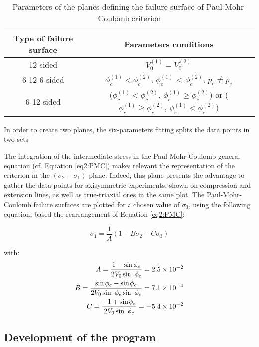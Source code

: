 \begin{table}
    \centering 
    \begin{tabular}{cc}
        \hline 
        Type of failure surface & Parameters conditions   \\
        \hline
        \hline
        12-sided & $V_0^{(1)} = V_0^{(2)}$ \\
        6-12-6 sided & $\phi_{c}^{(1)} < \phi_{c}^{(2)}$, $\phi_{e}^{(1)}$ < $\phi_{e}^{(2)}$, $p_c \neq p_e$\\ 
        6-12 sided & ($\phi_{c}^{(1)} < \phi_{c}^{(2)}$, $\phi_{e}^{(1)} \geq \phi_{e}^{(2)}$) or ($\phi_{c}^{(1)} \geq \phi_{c}^{(2)}$, $\phi_{e}^{(1)} < \phi_{e}^{(2)}$)\\
        \hline
    \end{tabular}
    \captionsetup{justification=centering}
    \caption{Parameters of the planes defining the failure surface of Paul-Mohr-Coulomb criterion}
    \label{tb5:pmc6p_pyramids}
\end{table}

In order to create two planes, the six-parameters fitting splits the data points in two sets 




The integration of the intermediate stress in the Paul-Mohr-Coulomb general equation (cf. Equation \ref{eq2:PMC}) makes relevant the representation of the criterion in the $(\sigma_2-\sigma_1)$ plane. Indeed, this plane presents the advantage to gather the data points for axisymmetric experiments, shown on compression and extension lines, as well as true-triaxial ones in the same plot. The Paul-Mohr-Coulomb failure surfaces are plotted for a chosen value of $\sigma_3$, using the following equation, based the rearrangement of Equation \ref{eq2:PMC}:

\begin{equation}\label{eq5:pmc_sig2sig1}
    \sigma_1 = \frac{1}{A}\left(1-B\sigma_2-C\sigma_3\right)
\end{equation}

with:
\begin{align}
    A = \frac{1-\sin \phi_c}{2V_0\sin \phi_c} = \num{2.5d-2}\\
    B = \frac{\sin \phi_c - \sin \phi_e}{2V_0 \sin \phi_e \sin \phi_c} = \num{7.1d-4} \\
    C = \frac{-1+\sin \phi_e}{2V_0\sin \phi_e} = -\num{5.4d-2} \\
\end{align}

\subsection{Development of the program}

